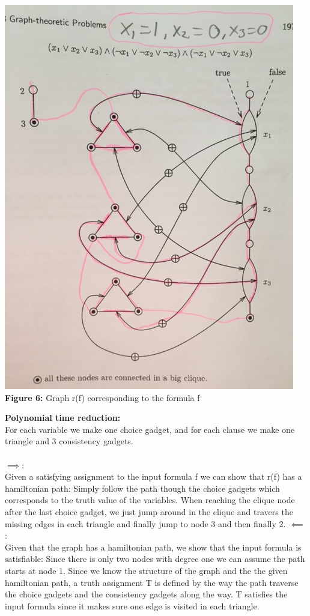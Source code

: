 \documentclass{article}
\begin{document}
\begin{center}
\includegraphics[scale=0.5, angle =-90]{3SATtoHAM}\\
\textbf{Figure 6:} Graph r(f) corresponding to the formula f
\end{center}
\textbf{Polynomial time reduction:}\\
For each variable we make one choice gadget, and for each clause we make one triangle and 3 consistency gadgets.\\\\
$\implies$: \\
Given a satisfying assignment to the input formula f we can show that r(f) has a hamiltonian path: Simply follow the path though the choice gadgets which corresponds to the truth value of the variables. When reaching the clique node after the last choice gadget, we just jump around in the clique and travers the missing edges in each triangle and finally jump to node 3 and then finally 2. 
$\impliedby$: \\
Given that the graph has a hamiltonian path, we show that the input formula is satisfiable: Since there is only two nodes with degree one we can assume the path starts at node 1. Since we know the structure of the graph and the the given hamiltonian path, a truth assignment T is defined by the way the path traverse the choice gadgets and the consistency gadgets along the way. T satisfies the input formula since it makes sure one edge is visited in each triangle. 
\newpage
\end{document}
